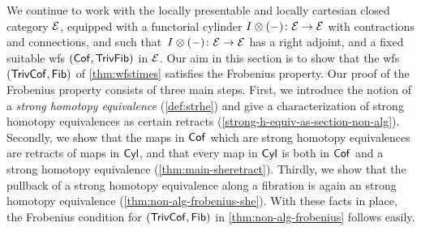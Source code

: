 \documentclass[reqno,10pt,a4paper,oneside,draft]{amsart}
\begin{document}
We continue to work with the locally presentable and locally cartesian closed category $\mathcal{E}$, equipped with a functorial cylinder $I\otimes (-) \colon \mathcal{E} \to \mathcal{E}$ with contractions and connections, and such that~$I\otimes (-) \colon \mathcal{E} \to \mathcal{E}$ has a right adjoint, and a fixed suitable wfs $(\mathsf{Cof}, \mathsf{TrivFib})$ in $\mathcal{E}$. 
Our aim in this section is to show that the wfs $(\mathsf{TrivCof}, \mathsf{Fib})$ of \cref{thm:wfstimes} satisfies the Frobenius property.
Our proof of the Frobenius property consists of three main steps.
First, we introduce the notion of a \emph{strong homotopy equivalence} (\cref{def:strhe}) and give a characterization of strong homotopy equivalences as certain retracts (\cref{strong-h-equiv-as-section-non-alg}).
Secondly, we show that the maps in $\mathsf{Cof}$ which are strong homotopy equivalences are retracts of maps in $\mathsf{Cyl}$, and that every map in $\mathsf{Cyl}$ is both in $\mathsf{Cof}$ and a strong homotopy
equivalence (\cref{thm:main-sheretract}).
Thirdly, we show that the pullback of a strong homotopy equivalence along a fibration is again an strong homotopy equivalence (\cref{thm:non-alg-frobenius-she}).
With these facts in place, the Frobenius condition for $(\mathsf{TrivCof}, \mathsf{Fib})$ in \cref{thm:non-alg-frobenius} follows easily.
\end{document}
